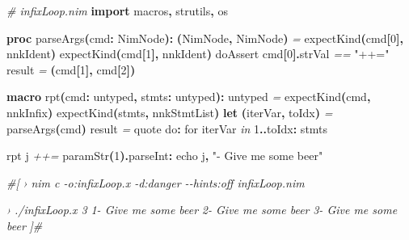 \documentclass[
  12pt,
]{book}
\newenvironment{Shaded}{}{}
\newcommand{\CommentTok}[1]{\textcolor[rgb]{0.38,0.63,0.69}{\textit{#1}}}
\newcommand{\DataTypeTok}[1]{\textcolor[rgb]{0.56,0.13,0.00}{#1}}
\newcommand{\DecValTok}[1]{\textcolor[rgb]{0.25,0.63,0.44}{#1}}
\newcommand{\KeywordTok}[1]{\textcolor[rgb]{0.00,0.44,0.13}{\textbf{#1}}}
\newcommand{\NormalTok}[1]{#1}
\newcommand{\OtherTok}[1]{\textcolor[rgb]{0.00,0.44,0.13}{#1}}
\newcommand{\StringTok}[1]{\textcolor[rgb]{0.25,0.44,0.63}{#1}}
\begin{document}
\begin{Shaded}
\begin{Highlighting}[]
\CommentTok{\# infixLoop.nim}
\KeywordTok{import}\NormalTok{ macros}\KeywordTok{,}\NormalTok{ strutils}\KeywordTok{,}\NormalTok{ os}

\KeywordTok{proc }\StringTok{parseArgs}\KeywordTok{(}\NormalTok{cmd}\KeywordTok{:} \DataTypeTok{NimNode}\KeywordTok{):} \KeywordTok{(}\DataTypeTok{NimNode}\KeywordTok{,} \DataTypeTok{NimNode}\KeywordTok{)} \CommentTok{=}
  \DataTypeTok{expectKind}\KeywordTok{(}\NormalTok{cmd}\KeywordTok{[}\DecValTok{0}\KeywordTok{],}\NormalTok{ nnkIdent}\KeywordTok{)}
  \DataTypeTok{expectKind}\KeywordTok{(}\NormalTok{cmd}\KeywordTok{[}\DecValTok{1}\KeywordTok{],}\NormalTok{ nnkIdent}\KeywordTok{)}
  \DataTypeTok{doAssert}\NormalTok{ cmd}\KeywordTok{[}\DecValTok{0}\KeywordTok{].}\DataTypeTok{strVal} \CommentTok{==} \StringTok{"++="}
  \OtherTok{result} \CommentTok{=} \KeywordTok{(}\NormalTok{cmd}\KeywordTok{[}\DecValTok{1}\KeywordTok{],}\NormalTok{ cmd}\KeywordTok{[}\DecValTok{2}\KeywordTok{])} 

\KeywordTok{macro }\StringTok{rpt}\KeywordTok{(}\NormalTok{cmd}\KeywordTok{:} \DataTypeTok{untyped}\KeywordTok{,}\NormalTok{ stmts}\KeywordTok{:} \DataTypeTok{untyped}\KeywordTok{):} \DataTypeTok{untyped} \CommentTok{=}
  \DataTypeTok{expectKind}\KeywordTok{(}\NormalTok{cmd}\KeywordTok{,}\NormalTok{ nnkInfix}\KeywordTok{)}
  \DataTypeTok{expectKind}\KeywordTok{(}\NormalTok{stmts}\KeywordTok{,}\NormalTok{ nnkStmtList}\KeywordTok{)}
  \KeywordTok{let} \KeywordTok{(}\NormalTok{iterVar}\KeywordTok{,}\NormalTok{ toIdx}\KeywordTok{)} \CommentTok{=} \DataTypeTok{parseArgs}\KeywordTok{(}\NormalTok{cmd}\KeywordTok{)}
  \OtherTok{result} \CommentTok{=} \DataTypeTok{quote} \DataTypeTok{do}\KeywordTok{:}
    \DataTypeTok{for}\NormalTok{ \textasciigrave{}iterVar\textasciigrave{} }\CommentTok{in} \DecValTok{1}\KeywordTok{..}\NormalTok{\textasciigrave{}toIdx\textasciigrave{}}\KeywordTok{:}
\NormalTok{      \textasciigrave{}stmts\textasciigrave{}}

\DataTypeTok{rpt}\NormalTok{ j }\CommentTok{++=} \DataTypeTok{paramStr}\KeywordTok{(}\DecValTok{1}\KeywordTok{).}\DataTypeTok{parseInt}\KeywordTok{:}
    \DataTypeTok{echo}\NormalTok{ j}\KeywordTok{,} \StringTok{"{-} Give me some beer"}

\CommentTok{\#[}
\CommentTok{› nim c {-}o:infixLoop.x {-}d:danger {-}{-}hints:off infixLoop.nim}

\CommentTok{› ./infixLoop.x 3}
\CommentTok{1{-} Give me some beer}
\CommentTok{2{-} Give me some beer}
\CommentTok{3{-} Give me some beer}
\CommentTok{]\#}
\end{Highlighting}
\end{Shaded}
\end{document}
